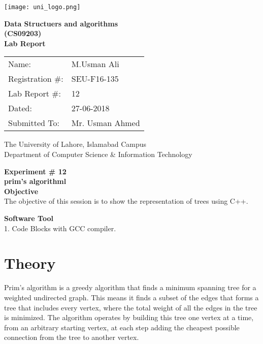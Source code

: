 \documentclass[11pt]{article}            %
\begin{document}
\begin{titlepage}
    \centering
  \vfill
    \texttt{[image: uni\_logo.png]} \\ 
	\vskip2cm
    {\bfseries\Large
	Data Structuers and algorithms \\ (CS09203)\\
	
	\vskip2cm
	Lab Report 
	 
	\vskip2cm
	}    

\begin{center}
\begin{tabular}{ l l  } 

Name: & M.Usman Ali \\ 
Registration \#: & SEU-F16-135 \\ 
Lab Report \#: & 12 \\ 
 Dated:& 27-06-2018\\ 
Submitted To:& Mr. Usman Ahmed\\ 

\end{tabular}
\end{center}
    \vfill
    The University of Lahore, Islamabad Campus\\
Department of Computer Science \& Information Technology
\end{titlepage}


    
    {\bfseries\Large
\centering
	Experiment \# 12 \\

prim's algorithml \\
	
	}    
 \vskip1cm
 \textbf {Objective}\\ The objective of this session is to show the representation of trees using C++. 
 
 \textbf {Software Tool} \\
 1. Code Blocks with GCC compiler.

\section{Theory }              

 Prim's algorithm is a greedy algorithm that finds a minimum spanning tree for a weighted undirected graph. This means it finds a subset of the edges that forms a tree that includes every vertex, where the total weight of all the edges in the tree is minimized. The algorithm operates by building this tree one vertex at a time, from an arbitrary starting vertex, at each step adding the cheapest possible connection from the tree to another vertex.
\end{document}
